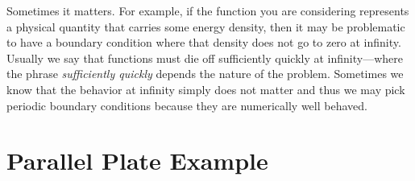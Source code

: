 \documentclass[12pt, oneside]{report}    %
\let\oldsection\section
\def\section{%
  \setcounter{sidenote}{1}%
  \oldsection
}
\begin{document}
Sometimes it matters. For example, if the function you are considering represents a physical quantity that carries some energy density, then it may be problematic to have a boundary condition where that density does not go to zero at infinity. Usually we say that functions must die off sufficiently quickly at infinity---where the phrase \emph{sufficiently quickly} depends the nature of the problem. Sometimes we know that the behavior at infinity simply does not matter and thus we may pick periodic boundary conditions because they are numerically well behaved.

\section{Parallel Plate Example}
\end{document}
